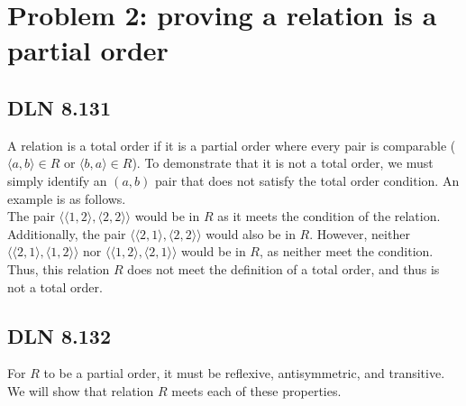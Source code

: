 \documentclass[titlepage]{article}
\begin{document}
\section{Problem 2: proving a relation is a partial order}

\subsection{DLN 8.131}

A relation is a total order if it is a partial order where every pair is comparable ($\langle a,b \rangle \in R$ or $\langle b,a \rangle \in R$). To demonstrate that it is not a total order, we must simply identify an $(a,b)$ pair that does not satisfy the total order condition. An example is as follows.\\
The pair $\langle \langle 1,2 \rangle , \langle 2,2 \rangle \rangle$ would be in $R$ as it meets the condition of the relation. Additionally, the pair $\langle \langle 2,1 \rangle , \langle 2,2 \rangle \rangle$ would also be in $R$. However, neither $\langle \langle 2,1 \rangle , \langle 1,2 \rangle \rangle$ nor $\langle \langle 1,2 \rangle , \langle 2,1 \rangle \rangle$ would be in $R$, as neither meet the condition. Thus, this relation $R$ does not meet the definition of a total order, and thus is not a total order.

\subsection{DLN 8.132}

For $R$ to be a partial order, it must be reflexive, antisymmetric, and transitive. We will show that relation $R$ meets each of these properties.
 
\end{document}
